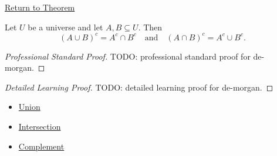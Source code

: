 \newpage
{}
\label{prf:de-morgan}

\begin{remark*}[Return]
\hyperref[thm:de-morgan]{Return to Theorem}
\end{remark*}

\begin{theorem*}
Let $U$ be a universe and let $A,B \subseteq U$. Then
\[
(A \cup B)^c = A^c \cap B^c
\quad\text{and}\quad
(A \cap B)^c = A^c \cup B^c.
\]
\end{theorem*}

\begin{proof}[Professional Standard Proof]
\LRAProofBodyStart
TODO: professional standard proof for de-morgan.
\end{proof}

\begin{proof}[Detailed Learning Proof]
\LRAProofBodyStart
TODO: detailed learning proof for de-morgan.
\end{proof}

\begin{remark*}
\end{remark*}

\begin{dependencies}
\begin{itemize}
  \item \hyperref[def:union]{Union}
  \item \hyperref[def:intersection]{Intersection}
  \item \hyperref[def:complement]{Complement}
\end{itemize}
\end{dependencies}

\clearpage
